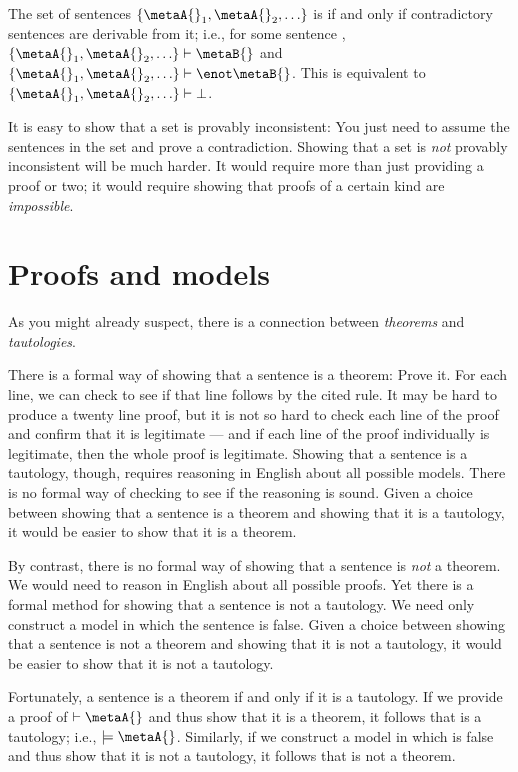 The set of sentences $\{\metaA{}_1,\metaA{}_2,\ldots\}$ is  if and only if contradictory sentences are derivable from it; i.e., for some sentence \metaB{}, $\{\metaA{}_1,\metaA{}_2,\ldots\}\vdash\metaB{}$ and $\{\metaA{}_1,\metaA{}_2,\ldots\}\vdash\enot \metaB{}$. This is equivalent to $\{\metaA{}_1,\metaA{}_2,\ldots\}\vdash\bot$.

It is easy to show that a set is provably inconsistent: You just need to assume the sentences in the set and prove a contradiction. Showing that a set is \emph{not} provably inconsistent will be much harder. It would require more than just providing a proof or two; it would require showing that proofs of a certain kind are \emph{impossible}.


\section{Proofs and models}
As you might already suspect, there is a connection between \emph{theorems} and \emph{tautologies}.

There is a formal way of showing that a sentence is a theorem: Prove it. For each line, we can check to see if that line follows by the cited rule. It may be hard to produce a twenty line proof, but it is not so hard to check each line of the proof and confirm that it is legitimate --- and if each line of the proof individually is legitimate, then the whole proof is legitimate. Showing that a sentence is a tautology, though, requires reasoning in English about all possible models. There is no formal way of checking to see if the reasoning is sound. Given a choice between showing that a sentence is a theorem and showing that it is a tautology, it would be easier to show that it is a theorem.

By contrast, there is no formal way of showing that a sentence is \emph{not} a theorem. We would need to reason in English about all possible proofs. Yet there is a formal method for showing that a sentence is not a tautology. We need only construct a model in which the sentence is false. Given a choice between showing that a sentence is not a theorem and showing that it is not a tautology, it would be easier to show that it is not a tautology.

Fortunately, a sentence is a theorem if and only if it is a tautology. If we provide a proof of $\vdash\metaA{}$ and thus show that it is a theorem, it follows that \metaA{} is a tautology; i.e., $\models\metaA{}$. Similarly, if we construct a model in which \metaA{} is false and thus show that it is not a tautology, it follows that \metaA{} is not a theorem.

